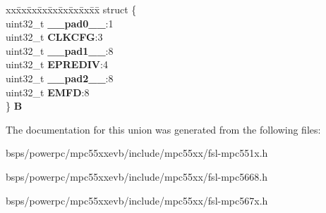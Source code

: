 \begin{DoxyCompactItemize}
\begin{tabbing}
\end{tabbing}\item 
\mbox{\label{unionFMPLL__tag_1_1FMPLL__ESYNCR1__tag_a35a5516fed25f5993b9f4dd5f9124bda}} 
\begin{tabbing}
xx\=xx\=xx\=xx\=xx\=xx\=xx\=xx\=xx\=\kill
struct \{\\
\>uint32\_t {\bfseries \_\_pad0\_\_}:1\\
\>uint32\_t {\bfseries CLKCFG}:3\\
\>uint32\_t {\bfseries \_\_pad1\_\_}:8\\
\>uint32\_t {\bfseries EPREDIV}:4\\
\>uint32\_t {\bfseries \_\_pad2\_\_}:8\\
\>uint32\_t {\bfseries EMFD}:8\\
\} {\bfseries B}\\

\end{tabbing}\end{DoxyCompactItemize}


The documentation for this union was generated from the following files\+:\begin{DoxyCompactItemize}
\item 
bsps/powerpc/mpc55xxevb/include/mpc55xx/fsl-\/mpc551x.\+h\item 
bsps/powerpc/mpc55xxevb/include/mpc55xx/fsl-\/mpc5668.\+h\item 
bsps/powerpc/mpc55xxevb/include/mpc55xx/fsl-\/mpc567x.\+h\end{DoxyCompactItemize}

